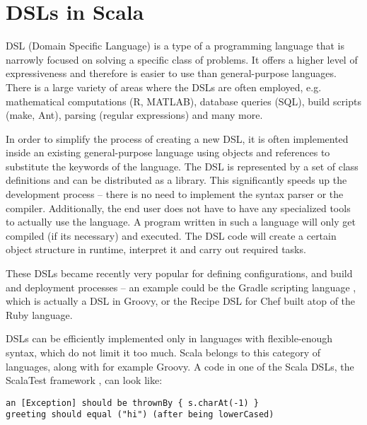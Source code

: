 



\section{DSLs in Scala}
\label{sec:dsls}

DSL (Domain Specific Language) is a type of a programming language that is narrowly focused on solving a specific class of problems. It offers a higher level of expressiveness and therefore is easier to use than general-purpose languages. There is a large variety of areas where the DSLs are often employed, e.g. mathematical computations (R, MATLAB), database queries (SQL), build scripts (make, Ant), parsing (regular expressions) and many more.

In order to simplify the process of creating a new DSL, it is often implemented inside an existing general-purpose language using objects and references to substitute the keywords of the language. The DSL is represented by a set of class definitions and can be distributed as a library. This significantly speeds up the development process -- there is no need to implement the syntax parser or the compiler. Additionally, the end user does not have to have any specialized tools to actually use the language. A program written in such a language will only get compiled (if its necessary) and executed. The DSL code will create a certain object structure in runtime, interpret it and carry out required tasks.

These DSLs became recently very popular for defining configurations, and build and deployment processes -- an example could be the Gradle scripting language \cite{noauthor_gradle_nodate}, which is actually a DSL in Groovy, or the Recipe DSL for Chef \cite{noauthor_chef_nodate} built atop of the Ruby language.

DSLs can be efficiently implemented only in languages with flexible-enough syntax, which do not limit it too much. Scala belongs to this category of languages, along with for example Groovy. A code in one of the Scala DSLs, the ScalaTest framework \cite{noauthor_scalatest:_2017}, can look like:

\lstset{style=Scala}
\begin{lstlisting}
an [Exception] should be thrownBy { s.charAt(-1) }
greeting should equal ("hi") (after being lowerCased)
\end{lstlisting}


